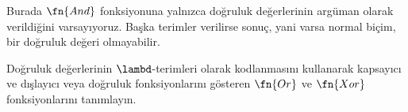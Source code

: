 Burada $\fn{And}$ fonksiyonuna yalnızca doğruluk değerlerinin argüman olarak
verildiğini varsayıyoruz. Başka terimler verilirse sonuç, yani varsa normal
biçim, bir doğruluk değeri olmayabilir.

\begin{prob}
  Doğruluk değerlerinin $\lambd$-terimleri olarak kodlanmasını kullanarak
  kapsayıcı ve dışlayıcı veya doğruluk fonksiyonlarını gösteren $\fn{Or}$ ve
  $\fn{Xor}$ fonksiyonlarını tanımlayın.
\end{prob}

